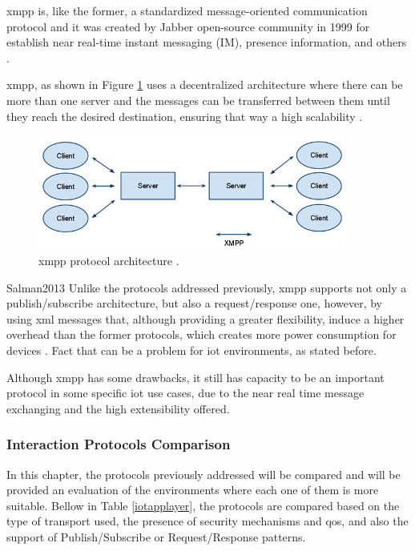 \acf{xmpp} is, like the former, a standardized message-oriented communication protocol and it was created by Jabber open-source community in 1999 for establish near real-time instant messaging (IM), presence information, and others \cite{Badugu}.

\ac{xmpp}, as shown in Figure \ref{fig:xmpp} uses a decentralized architecture where there can be more than one server and the messages can be transferred between them until they reach the desired destination, ensuring that way a high scalability \cite{Al-fuqaha2015}.

\begin{figure}[H]
	\centering
	\includegraphics[width=0.9\textwidth]{figures/xmpp.png}
	\caption{\ac{xmpp} protocol architecture \cite{Adafruit}.}
	\label{fig:xmpp}
\end{figure}

Salman2013
Unlike the protocols addressed previously, \ac{xmpp} supports not only a publish/subscribe architecture, but also a request/response one, however, by using \ac{xml} messages that, although providing a greater flexibility, induce a higher overhead than the former protocols, which creates more power consumption for devices \cite{Salman2013}. Fact that can be a problem for \ac{iot} environments, as stated before.

Although \ac{xmpp} has some drawbacks, it still has capacity to be an important protocol in some specific \ac{iot} use cases, due to the near real time message exchanging and the high extensibility offered.

\subsubsection{Interaction Protocols Comparison}

In this chapter, the protocols previously addressed will be compared and will be provided an evaluation of the environments where each one of them is more suitable. Bellow in Table \ref{iotapplayer}, the protocols are compared based on the type of transport used, the presence of security mechanisms and \ac{qos}, and also the support of Publish/Subscribe or Request/Response patterns.

